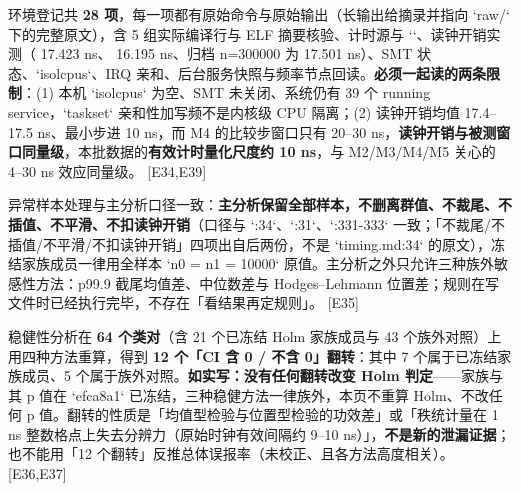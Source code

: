 \documentclass[UTF8,fontset=fandol,11pt,a4paper]{ctexart}
\begin{document}
环境登记共 \textbf{28 项}，每一项都有原始命令与原始输出（长输出给摘录并指向 `raw/` 下的完整原文），含 5 组实际编译行与 ELF 摘要核验、计时源与 `\texttt{}`、读钟开销实测（\texttt{} 17.423 ns、\texttt{} 16.195 ns、归档 n=300000 为 17.501 ns）、SMT 状态、`isolcpus`、IRQ 亲和、后台服务快照与频率节点回读。\textbf{必须一起读的两条限制}：(1) 本机 `isolcpus` 为空、SMT 未关闭、系统仍有 39 个 running service，`taskset` 亲和性加写频不是内核级 CPU 隔离；(2) 读钟开销均值 17.4–17.5 ns、最小步进 10 ns，而 M4 的比较步窗口只有 20–30 ns，\textbf{读钟开销与被测窗口同量级}，本批数据的\textbf{有效计时量化尺度约 10 ns}，与 M2/M3/M4/M5 关心的 4–30 ns 效应同量级。 [E34,E39]


异常样本处理与主分析口径一致：\textbf{主分析保留全部样本，不删离群值、不裁尾、不插值、不平滑、不扣读钟开销}（口径与 `\texttt{}:34`、`\texttt{}:31`、`\texttt{}:331-333` 一致；「不裁尾/不插值/不平滑/不扣读钟开销」四项出自后两份，不是 `timing.md:34` 的原文），冻结家族成员一律用全样本 `n0 = n1 = 10000` 原值。主分析之外只允许三种族外敏感性方法：p99.9 截尾均值差、中位数差与 Hodges–Lehmann 位置差；规则在写文件时已经执行完毕，不存在「看结果再定规则」。 [E35]


稳健性分析在 \textbf{64 个类对}（含 21 个已冻结 Holm 家族成员与 43 个族外对照）上用四种方法重算，得到 \textbf{12 个「CI 含 0 / 不含 0」翻转}：其中 7 个属于已冻结家族成员、5 个属于族外对照。\textbf{如实写：没有任何翻转改变 Holm 判定}——家族与其 p 值在 `efca8a1` 已冻结，三种稳健方法一律族外，本页不重算 Holm、不改任何 p 值。翻转的性质是「均值型检验与位置型检验的功效差」或「秩统计量在 1 ns 整数格点上失去分辨力（原始时钟有效间隔约 9–10 ns）」，\textbf{不是新的泄漏证据}；也不能用「12 个翻转」反推总体误报率（未校正、且各方法高度相关）。 [E36,E37]
\end{document}
